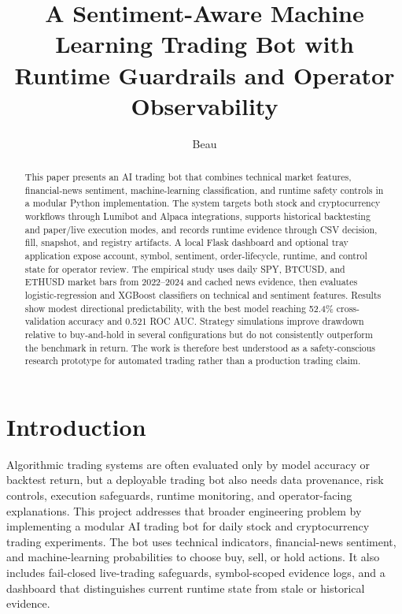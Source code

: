 \documentclass[sigconf,nonacm]{acmart}
\title{A Sentiment-Aware Machine Learning Trading Bot with Runtime Guardrails and Operator Observability}
\author{Beau}
\affiliation{%
  \institution{Final Project}
  \city{}
  \country{United States}}
\begin{document}
\begin{abstract}
This paper presents an AI trading bot that combines technical market features, financial-news sentiment, machine-learning classification, and runtime safety controls in a modular Python implementation. The system targets both stock and cryptocurrency workflows through Lumibot and Alpaca integrations, supports historical backtesting and paper/live execution modes, and records runtime evidence through CSV decision, fill, snapshot, and registry artifacts. A local Flask dashboard and optional tray application expose account, symbol, sentiment, order-lifecycle, runtime, and control state for operator review. The empirical study uses daily SPY, BTCUSD, and ETHUSD market bars from 2022--2024 and cached news evidence, then evaluates logistic-regression and XGBoost classifiers on technical and sentiment features. Results show modest directional predictability, with the best model reaching 52.4\% cross-validation accuracy and 0.521 ROC AUC. Strategy simulations improve drawdown relative to buy-and-hold in several configurations but do not consistently outperform the benchmark in return. The work is therefore best understood as a safety-conscious research prototype for automated trading rather than a production trading claim.
\end{abstract}


\maketitle

\section{Introduction}
Algorithmic trading systems are often evaluated only by model accuracy or backtest return, but a deployable trading bot also needs data provenance, risk controls, execution safeguards, runtime monitoring, and operator-facing explanations. This project addresses that broader engineering problem by implementing a modular AI trading bot for daily stock and cryptocurrency trading experiments. The bot uses technical indicators, financial-news sentiment, and machine-learning probabilities to choose buy, sell, or hold actions. It also includes fail-closed live-trading safeguards, symbol-scoped evidence logs, and a dashboard that distinguishes current runtime state from stale or historical evidence.
\end{document}

